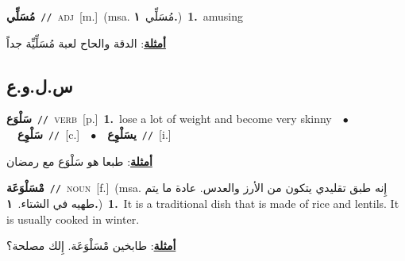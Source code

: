 \documentclass[10pt,a4paper,twoside]{article} %
\begin{document}
\begin{multicols}{2}
{\setlength\topsep{0pt}\textbf{\foreignlanguage{arabic}{مُسَلِّي}}\ {\color{gray}\texttt{//}\color{black}}\ \textsc{adj}\ [m.]\ \color{gray}(msa. \foreignlanguage{arabic}{مُسَلِّي}~\foreignlanguage{arabic}{\textbf{١.}})\color{black}\ \textbf{1.}~amusing\  \begin{flushright}\color{gray}\foreignlanguage{arabic}{\textbf{\underline{\foreignlanguage{arabic}{أمثلة}}}: الدقة والحاح لعبة مُسَلِّيِّة جداً}\end{flushright}\color{black}} \vspace{2mm}

\vspace{-3mm}
\subsection*{\color{blue}\foreignlanguage{arabic}{س.ل.و.ع}\color{blue}{}} 

{\setlength\topsep{0pt}\textbf{\foreignlanguage{arabic}{سَلْوَع}}\ {\color{gray}\texttt{//}\color{black}}\ \textsc{verb}\ [p.]\ \textbf{1.}~lose a lot of weight and become very skinny\ \ $\bullet$\ \ \setlength\topsep{0pt}\textbf{\foreignlanguage{arabic}{سَلْوِع}}\ {\color{gray}\texttt{//}\color{black}}\ [c.]\ \ $\bullet$\ \ \setlength\topsep{0pt}\textbf{\foreignlanguage{arabic}{يسَلْوِع}}\ {\color{gray}\texttt{//}\color{black}}\ [i.]\  \begin{flushright}\color{gray}\foreignlanguage{arabic}{\textbf{\underline{\foreignlanguage{arabic}{أمثلة}}}: طبعا هو سَلْوَع مع رمضان}\end{flushright}\color{black}} \vspace{2mm}

{\setlength\topsep{0pt}\textbf{\foreignlanguage{arabic}{مْسَلْوَعَة}}\ {\color{gray}\texttt{//}\color{black}}\ \textsc{noun}\ [f.]\ \color{gray}(msa. \foreignlanguage{arabic}{إِنه طبق تقليدي يتكون من الأرز والعدس. عادة ما يتم طهيه في الشتاء.}~\foreignlanguage{arabic}{\textbf{١.}})\color{black}\ \textbf{1.}~It is a traditional dish that is made of rice and lentils. It is usually cooked in winter.\  \begin{flushright}\color{gray}\foreignlanguage{arabic}{\textbf{\underline{\foreignlanguage{arabic}{أمثلة}}}: طابخين مْسَلْوَعَة. إِلك مصلحة؟}\end{flushright}\color{black}} \vspace{2mm}


\end{multicols}
\end{document}
